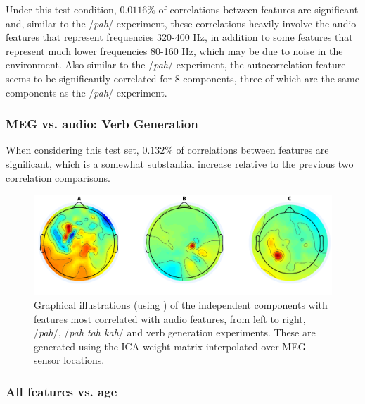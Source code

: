 \documentclass[a4paper]{article}
\begin{document}
Under this test condition, $0.0116$\% of correlations between features are significant and, similar to the /{\em pah}/ experiment, these correlations heavily involve the audio features that represent frequencies 320-400 Hz, in addition to some features that represent much lower frequencies 80-160 Hz, which may be due to noise in the environment. Also similar to the /{\em pah}/ experiment, the autocorrelation feature seems to be significantly correlated for 8 components, three of which are the same components as the /{\em pah}/ experiment.


\subsubsection{MEG vs. audio: Verb Generation}

When considering this test set, $0.132$\% of correlations between features are significant, which is a somewhat substantial increase relative to the previous two correlation comparisons.

\begin{figure}[t]
  \centering
  \includegraphics[width=\linewidth]{AllComponents.png}
  \caption{Graphical illustrations (using \cite{Delorme04eeglab}) of the independent components with features most correlated with audio features, from left to right, /{\em pah}/, /{\em pah tah kah}/ and verb generation experiments. These are generated using the ICA weight matrix interpolated over MEG sensor locations. }
  \label{fig:components}
\end{figure}

\subsubsection{All features vs. age}
\end{document}
